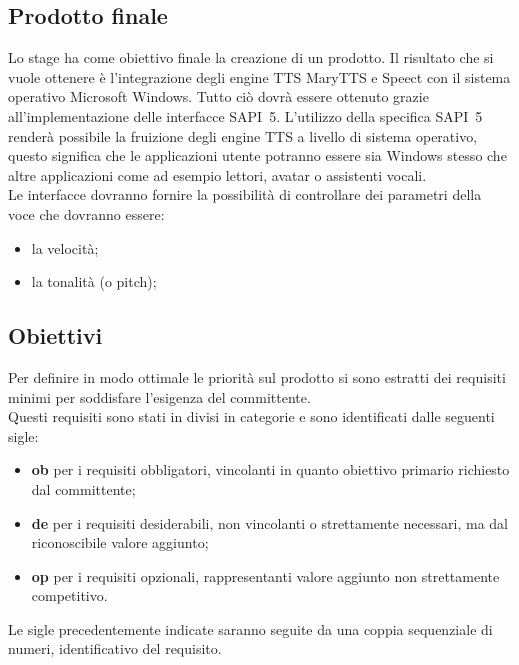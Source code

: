 \subsection{Prodotto finale}
Lo stage ha come obiettivo finale la creazione di un prodotto.
Il risultato che si vuole ottenere è l'integrazione degli engine TTS MaryTTS e Speect con il sistema operativo Microsoft Windows. Tutto ciò dovrà essere ottenuto grazie all'implementazione delle interfacce SAPI~5.
L'utilizzo della specifica SAPI~5 renderà possibile la fruizione degli engine TTS a livello di sistema operativo, questo significa che le applicazioni utente potranno essere sia Windows stesso che altre applicazioni come ad esempio lettori, avatar o assistenti vocali.\\
Le interfacce dovranno fornire la possibilità di controllare dei parametri della voce che dovranno essere:
\begin{itemize}
	\item la velocità;
	\item la tonalità (o pitch);
\end{itemize}


\subsection{Obiettivi}

Per definire in modo ottimale le priorità sul prodotto si sono estratti dei requisiti minimi per soddisfare l'esigenza del committente.\\
Questi requisiti sono stati in divisi in categorie e sono identificati dalle seguenti sigle:
\begin{itemize}
	\item \textbf{ob} per i requisiti obbligatori, vincolanti in quanto obiettivo primario
	richiesto dal committente;
	\item  \textbf{de} per i requisiti desiderabili, non vincolanti o strettamente necessari,
	ma dal riconoscibile valore aggiunto;
	\item \textbf{op} per i requisiti opzionali, rappresentanti valore aggiunto non
	strettamente competitivo.
\end{itemize}
Le sigle precedentemente indicate saranno seguite da una coppia sequenziale di numeri, identificativo del requisito.\\

